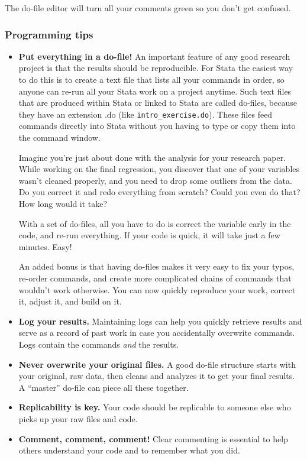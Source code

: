 \documentclass[11pt]{article}
\begin{document}
The do-file editor will turn all your comments green so you don't get
confused.

\hypertarget{programming-tips}{%
\subsubsection*{Programming tips}\label{programming-tips}}

\begin{itemize}
\item
  \textbf{Put everything in a do-file!} An important feature of any good
  research project is that the results should be reproducible. For Stata
  the easiest way to do this is to create a text file that lists all
  your commands in order, so anyone can re-run all your Stata work on a
  project anytime. Such text files that are produced within Stata or
  linked to Stata are called do-files, because they have an extension
  .do (like \texttt{intro\_exercise.do}). These files feed commands
  directly into Stata without you having to type or copy them into the
  command window.

  Imagine you're just about done with the analysis for your research
  paper. While working on the final regression, you discover that one of
  your variables wasn't cleaned properly, and you need to drop some
  outliers from the data. Do you correct it and redo everything from
  scratch? Could you even do that? How long would it take?

  With a set of do-files, all you have to do is correct the variable
  early in the code, and re-run everything. If your code is quick, it
  will take just a few minutes. Easy!

  An added bonus is that having do-files makes it very easy to fix your
  typos, re-order commands, and create more complicated chains of
  commands that wouldn't work otherwise. You can now quickly reproduce
  your work, correct it, adjust it, and build on it.
\item
  \textbf{Log your results.} Maintaining logs can help you quickly
  retrieve results and serve as a record of past work in case you
  accidentally overwrite commands. Logs contain the commands \emph{and}
  the results.
\item
  \textbf{Never overwrite your original files.} A good do-file structure
  starts with your original, raw data, then cleans and analyzes it to
  get your final results. A ``master'' do-file can piece all these
  together.
\item
  \textbf{Replicability is key.} Your code should be replicable to
  someone else who picks up your raw files and code.
\item
  \textbf{Comment, comment, comment!} Clear commenting is essential to
  help others understand your code and to remember what you did.
\end{itemize}
\end{document}
